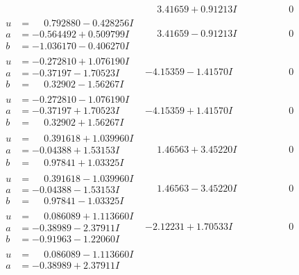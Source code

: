 \documentclass[1p]{elsarticle_modified}
\theoremstyle{definition}
\begin{document}
$$\begin{array}{c|c|c}
 & \phantom{-}3.41659 + 0.91213 I & \phantom{-0.000000 } 0 \\ \hline\begin{aligned}
u &= \phantom{-}0.792880 - 0.428256 I \\
a &= -0.564492 + 0.509799 I \\
b &= -1.036170 - 0.406270 I\end{aligned}
 & \phantom{-}3.41659 - 0.91213 I & \phantom{-0.000000 } 0 \\ \hline\begin{aligned}
u &= -0.272810 + 1.076190 I \\
a &= -0.37197 - 1.70523 I \\
b &= \phantom{-}0.32902 - 1.56267 I\end{aligned}
 & -4.15359 - 1.41570 I & \phantom{-0.000000 } 0 \\ \hline\begin{aligned}
u &= -0.272810 - 1.076190 I \\
a &= -0.37197 + 1.70523 I \\
b &= \phantom{-}0.32902 + 1.56267 I\end{aligned}
 & -4.15359 + 1.41570 I & \phantom{-0.000000 } 0 \\ \hline\begin{aligned}
u &= \phantom{-}0.391618 + 1.039960 I \\
a &= -0.04388 + 1.53153 I \\
b &= \phantom{-}0.97841 + 1.03325 I\end{aligned}
 & \phantom{-}1.46563 + 3.45220 I & \phantom{-0.000000 } 0 \\ \hline\begin{aligned}
u &= \phantom{-}0.391618 - 1.039960 I \\
a &= -0.04388 - 1.53153 I \\
b &= \phantom{-}0.97841 - 1.03325 I\end{aligned}
 & \phantom{-}1.46563 - 3.45220 I & \phantom{-0.000000 } 0 \\ \hline\begin{aligned}
u &= \phantom{-}0.086089 + 1.113660 I \\
a &= -0.38989 - 2.37911 I \\
b &= -0.91963 - 1.22060 I\end{aligned}
 & -2.12231 + 1.70533 I & \phantom{-0.000000 } 0 \\ \hline\begin{aligned}
u &= \phantom{-}0.086089 - 1.113660 I \\
a &= -0.38989 + 2.37911 I \\

\end{aligned}
\end{array}$$
\end{document}
